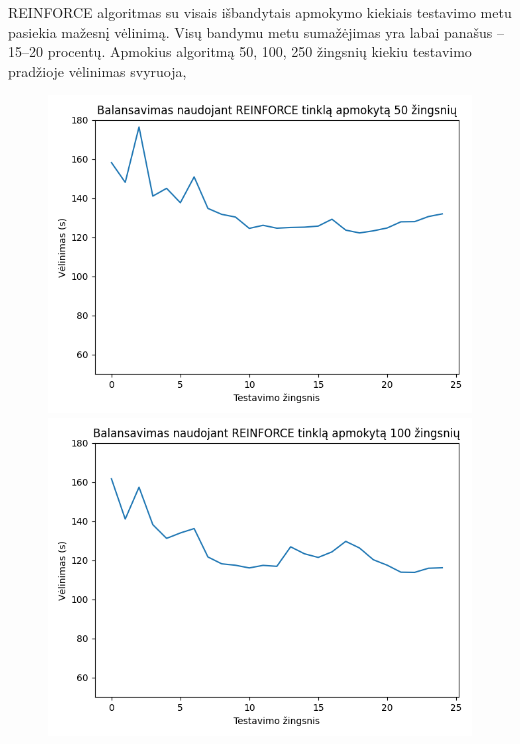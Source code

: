 \documentclass{VUMIFPSbakalaurinis}
\begin{document}
REINFORCE algoritmas su visais išbandytais apmokymo kiekiais testavimo metu pasiekia mažesnį vėlinimą. Visų bandymu metu sumažėjimas yra labai panašus – 15–20 procentų. Apmokius algoritmą 50, 100, 250 žingsnių kiekiu testavimo pradžioje vėlinimas svyruoja, 
\begin{figure}[h!]
    \centering
    \begin{minipage}[b]{0.45\textwidth}
        \includegraphics[width=\textwidth]{img/reinforce_50_2.png}
    \end{minipage}
    \hspace{1mm}
    \begin{minipage}[b]{0.45\textwidth}
        \includegraphics[width=\textwidth]{img/reinforce_100_2.png}

\end{minipage}
\end{figure}
\end{document}
